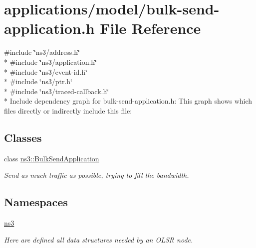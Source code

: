 \hypertarget{bulk-send-application_8h}{}\section{applications/model/bulk-\/send-\/application.h File Reference}
\label{bulk-send-application_8h}
{\ttfamily \#include \char`\"{}ns3/address.\+h\char`\"{}}\\*
{\ttfamily \#include \char`\"{}ns3/application.\+h\char`\"{}}\\*
{\ttfamily \#include \char`\"{}ns3/event-\/id.\+h\char`\"{}}\\*
{\ttfamily \#include \char`\"{}ns3/ptr.\+h\char`\"{}}\\*
{\ttfamily \#include \char`\"{}ns3/traced-\/callback.\+h\char`\"{}}\\*
Include dependency graph for bulk-\/send-\/application.h\+:
This graph shows which files directly or indirectly include this file\+:
\subsection*{Classes}
\begin{DoxyCompactItemize}
\item 
class \hyperlink{classns3_1_1BulkSendApplication}{ns3\+::\+Bulk\+Send\+Application}
\begin{DoxyCompactList}\small\item\em Send as much traffic as possible, trying to fill the bandwidth. \end{DoxyCompactList}\end{DoxyCompactItemize}
\subsection*{Namespaces}
\begin{DoxyCompactItemize}
\item 
 \hyperlink{namespacens3}{ns3}
\begin{DoxyCompactList}\small\item\em Here are defined all data structures needed by an O\+L\+SR node. \end{DoxyCompactList}\end{DoxyCompactItemize}

